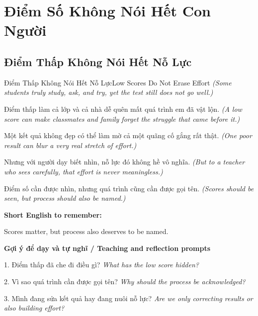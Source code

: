 \chapter{Điểm Số Không Nói Hết Con Người}

\section{Điểm Thấp Không Nói Hết Nỗ Lực}
\begin{truyen}{Điểm Thấp Không Nói Hết Nỗ Lực}{Low Scores Do Not Erase Effort}
\textit{(Some students truly study, ask, and try, yet the test still does not go well.)}

Điểm thấp làm cả lớp và cả nhà dễ quên mất quá trình em đã vật lộn.
\textit{(A low score can make classmates and family forget the struggle that came before it.)}

Một kết quả không đẹp có thể làm mờ cả một quãng cố gắng rất thật.
\textit{(One poor result can blur a very real stretch of effort.)}

Nhưng với người dạy biết nhìn, nỗ lực đó không hề vô nghĩa.
\textit{(But to a teacher who sees carefully, that effort is never meaningless.)}

\end{truyen}

\begin{baihoc}
Điểm số cần được nhìn, nhưng quá trình cũng cần được gọi tên.
\textit{(Scores should be seen, but process should also be named.)}
\end{baihoc}

\begin{ghinhoanh}
\textbf{Short English to remember:}

Scores matter, but process also deserves to be named.

\end{ghinhoanh}

\begin{tuhocnhanh}
\textbf{Gợi ý để dạy và tự nghĩ / Teaching and reflection prompts}

1. Điểm thấp đã che đi điều gì? \textit{What has the low score hidden?}

2. Vì sao quá trình cần được gọi tên? \textit{Why should the process be acknowledged?}

3. Mình đang sửa kết quả hay đang nuôi nỗ lực? \textit{Are we only correcting results or also building effort?}
\end{tuhocnhanh}
\ngancach

